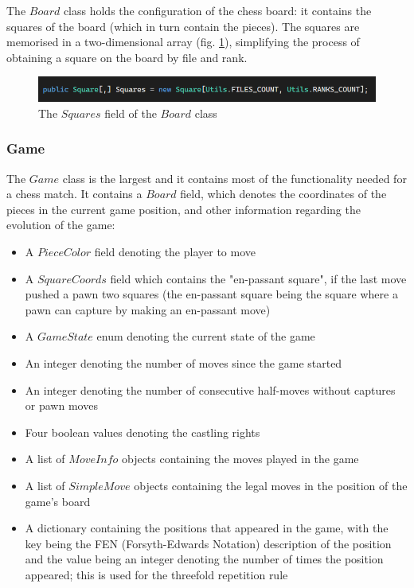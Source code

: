 The $Board$ class holds the configuration of the chess board: it contains the squares of the board (which in turn contain the pieces). The squares are memorised in a two-dimensional array (fig. \ref{fig:boardClassSquares}), simplifying the process of obtaining a square on the board by file and rank.

\begin{figure}[h]
    \centering
    \includegraphics[width=1\textwidth]{figures/board-class-squares.png}
    \caption{The $Squares$ field of the $Board$ class}
    \label{fig:boardClassSquares}
\end{figure}

\subsubsection{Game}
\label{subsubsec:ch5sec1subsec2subsubsec7}

The $Game$ class is the largest and it contains most of the functionality needed for a chess match. It contains a $Board$ field, which denotes the coordinates of the pieces in the current game position, and other information regarding the evolution of the game:

\begin{itemize}
    \item A $PieceColor$ field denoting the player to move
    \item A $SquareCoords$ field which contains the "en-passant square", if the last move pushed a pawn two squares (the en-passant square being the square where a pawn can capture by making an en-passant move)
    \item A $GameState$ enum denoting the current state of the game
    \item An integer denoting the number of moves since the game started
    \item An integer denoting the number of consecutive half-moves without captures or pawn moves
    \item Four boolean values denoting the castling rights
    \item A list of $MoveInfo$ objects containing the moves played in the game
    \item A list of $SimpleMove$ objects containing the legal moves in the position of the game's board
    \item A dictionary containing the positions that appeared in the game, with the key being the FEN (Forsyth-Edwards Notation) \cite{fen-desc} description of the position and the value being an integer denoting the number of times the position appeared; this is used for the threefold repetition rule
\end{itemize}

